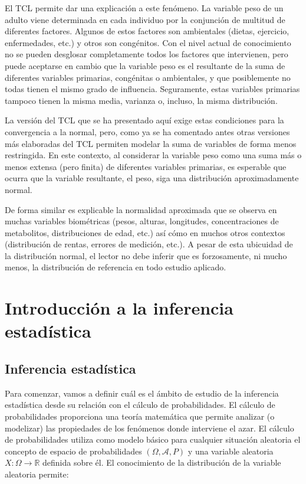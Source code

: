 \documentclass[
]{article}
\begin{document}
El TCL permite dar una explicación a este fenómeno. La variable peso de un adulto viene determinada en cada individuo por la conjunción de multitud de diferentes factores. Algunos de estos factores son ambientales (dietas, ejercicio, enfermedades, etc.) y otros son congénitos. Con el nivel actual de conocimiento no se pueden desglosar completamente todos los factores que intervienen, pero puede aceptarse en cambio que la variable peso es el resultante de la suma de diferentes variables primarias, congénitas o ambientales, y que posiblemente no todas tienen el mismo grado de influencia. Seguramente, estas variables primarias tampoco tienen la misma media, varianza o, incluso, la misma distribución.

La versión del TCL que se ha presentado aquí exige estas condiciones para la convergencia a la normal, pero, como ya se ha comentado antes otras versiones más elaboradas del TCL permiten modelar la suma de variables de forma menos restringida. En este contexto, al considerar la variable peso como una suma más o menos extensa (pero finita) de diferentes variables primarias, es esperable que ocurra que la variable resultante, el peso, siga una distribución aproximadamente normal.

De forma similar es explicable la normalidad aproximada que se observa en muchas variables biométricas (pesos, alturas, longitudes, concentraciones de metabolitos, distribuciones de edad, etc.) así cómo en muchos otros contextos (distribución de rentas, errores de medición, etc.). A pesar de esta ubicuidad de la distribución normal, el lector no debe inferir que es forzosamente, ni mucho menos, la distribución de referencia en todo estudio aplicado.

\section{Introducción a la inferencia estadística}\label{introducciuxf3n-a-la-inferencia-estaduxedstica}

\subsection{Inferencia estadística}\label{inferencia-estaduxedstica}

Para comenzar, vamos a definir cuál es el ámbito de estudio de la inferencia estadística desde su relación con el cálculo de probabilidades. El cálculo de probabilidades proporciona una teoría matemática que permite analizar (o modelizar) las propiedades de los fenómenos donde interviene el azar.
El cálculo de probabilidades utiliza como modelo básico para cualquier situación aleatoria el concepto de espacio de probabilidades \((\Omega, \mathcal{A}, P)\) y una variable aleatoria \(X: \Omega \rightarrow \mathbb{R}\) definida sobre él.
El conocimiento de la distribución de la variable aleatoria permite:
\end{document}
